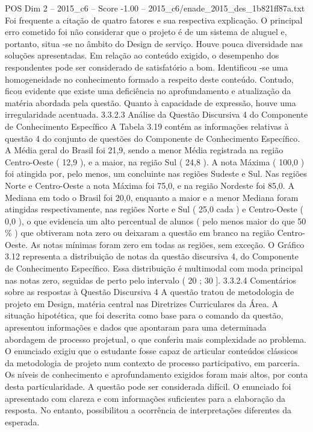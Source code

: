 \begin{textsample}{POS Dim 2 – 2015\_c6 – Score -1.00 – 2015\_c6/enade\_2015\_des\_1b821ff87a.txt}
Foi frequente a citação de quatro fatores e sua respectiva explicação.
O principal erro cometido foi não considerar que o projeto é de um sistema de aluguel e, portanto, situa -se no âmbito do Design de serviço.
Houve pouca diversidade nas soluções apresentadas.
Em relação ao conteúdo exigido, o desempenho dos respondentes pode ser considerado de satisfatório a bom.
Identificou -se uma homogeneidade no conhecimento formado a respeito deste conteúdo.
Contudo, ficou evidente que existe uma deficiência no aprofundamento e atualização da matéria abordada pela questão.
Quanto à capacidade de expressão, houve uma irregularidade acentuada. 3.3.2.3 Análise da Questão Discursiva 4 do Componente de Conhecimento Específico A Tabela 3.19 contém as informações relativas à questão 4 do conjunto de questões do Componente de Conhecimento Específico.
A Média geral do Brasil foi 21,9, sendo a menor Média registrada na região Centro-Oeste ( 12,9 ), e a maior, na região Sul ( 24,8 ).
A nota Máxima ( 100,0 ) foi atingida por, pelo menos, um concluinte nas regiões Sudeste e Sul.
Nas regiões Norte e Centro-Oeste a nota Máxima foi 75,0, e na região Nordeste foi 85,0.
A Mediana em todo o Brasil foi 20,0, enquanto a maior e a menor Mediana foram atingidas respectivamente, nas regiões Norte e Sul ( 25,0 cada ) e Centro-Oeste ( 0,0 ), o que evidencia um alto percentual de alunos ( pelo menos maior do que 50 \% ) que obtiveram nota zero ou deixaram a questão em branco na região Centro-Oeste.
As notas mínimas foram zero em todas as regiões, sem exceção.
O Gráfico 3.12 representa a distribuição de notas da questão discursiva 4, do Componente de Conhecimento Específico.
Essa distribuição é multimodal com moda principal nas notas zero, seguidas de perto pelo intervalo ( 20 ; 30 ]. 3.3.2.4 Comentários sobre as respostas à Questão Discursiva 4 A questão tratou de metodologia de projeto em Design, matéria central nas Diretrizes Curriculares da Área.
A situação hipotética, que foi descrita como base para o comando da questão, apresentou informações e dados que apontaram para uma determinada abordagem de processo projetual, o que conferiu mais complexidade ao problema.
O enunciado exigiu que o estudante fosse capaz de articular conteúdos clássicos da metodologia de projeto num contexto de processo participativo, em parceria.
Os níveis de conhecimento e aprofundamento exigidos foram mais altos, por conta desta particularidade.
A questão pode ser considerada difícil.
O enunciado foi apresentado com clareza e com informações suficientes para a elaboração da resposta.
No entanto, possibilitou a ocorrência de interpretações diferentes da esperada.

\end{textsample}
